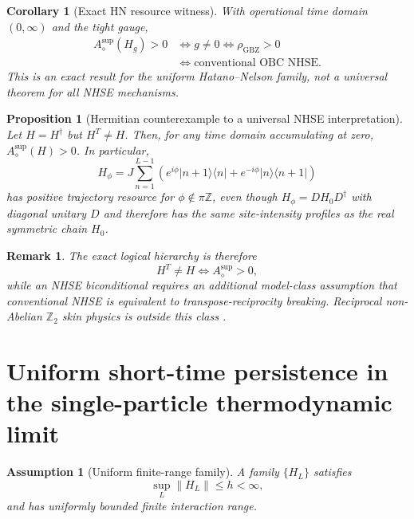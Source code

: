 \documentclass[reprint,amsmath,amssymb,aps,nofootinbib]{revtex4-2}
\newtheorem{proposition}{Proposition}
\newtheorem{corollary}{Corollary}
\newtheorem{remark}{Remark}
\newtheorem{assumption}{Assumption}
\newcommand{\GBZ}{\mathrm{GBZ}}
\newcommand{\norm}[1]{\left\lVert #1\right\rVert}
\begin{document}
\begin{corollary}[Exact HN resource witness]
With operational time domain $(0,\infty)$ and the tight gauge,
\begin{equation}
\boxed{\begin{aligned}
A_\diamond^{\sup}(H_g)>0
&\iff g\ne0\iff \rho_{\GBZ}>0\\
&\iff \text{conventional OBC NHSE}.
\end{aligned}}
\end{equation}
This is an exact result for the uniform Hatano--Nelson family, not a universal theorem for all
NHSE mechanisms.
\end{corollary}

\begin{proposition}[Hermitian counterexample to a universal NHSE interpretation]
Let $H=H^\dagger$ but $H^T\ne H$. Then, for any time domain accumulating at zero,
$A_\diamond^{\sup}(H)>0$. In particular,
\begin{equation}
H_\phi=J\sum_{n=1}^{L-1}
\left(e^{i\phi}|n+1\rangle\langle n|+e^{-i\phi}|n\rangle\langle n+1|\right)
\end{equation}
has positive trajectory resource for $\phi\notin\pi\mathbb Z$, even though
$H_\phi=DH_0D^\dagger$ with diagonal unitary $D$ and therefore has the same site-intensity
profiles as the real symmetric chain $H_0$.
\end{proposition}

\begin{remark}
The exact logical hierarchy is therefore
\begin{equation}
H^T\ne H\iff A_\diamond^{\sup}>0,
\end{equation}
while an NHSE biconditional requires an additional model-class assumption that conventional
NHSE is equivalent to transpose-reciprocity breaking. Reciprocal non-Abelian $\mathbb Z_2$ skin
physics is outside this class \cite{OkumaEtAl2020,TangZ2Skin2026}.
\end{remark}

\section{Uniform short-time persistence in the single-particle thermodynamic limit}
\label{sec:thermo}

\begin{assumption}[Uniform finite-range family]
A family $\{H_L\}$ satisfies
\begin{equation}
\sup_L\norm{H_L}\le h<\infty,
\end{equation}
and has uniformly bounded finite interaction range.
\end{assumption}
\end{document}
